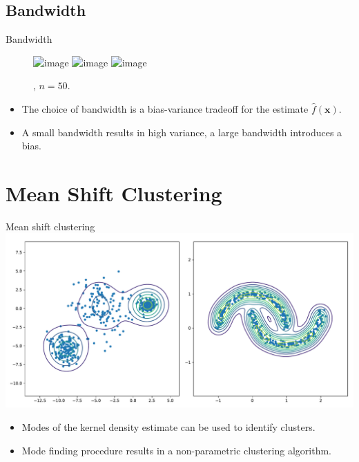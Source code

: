 \documentclass[18pt]{beamer}
\begin{document}
\subsection{Bandwidth}

\begin{frame}{Bandwidth}
	\begin{figure}
		\includegraphics<1>[width=\textwidth]{figures/kernel-density-estimation-gaussian-50}
		\includegraphics<2>[width=\textwidth]{figures/kernel-density-estimation-uniform-50}
		\includegraphics<3>[width=\textwidth]{figures/kernel-density-estimation-epanechnikov-50}
		\vspace*{-6mm}
		\caption{, $n = 50$.}
	\end{figure}
	\begin{itemize}
		\item The choice of bandwidth is a bias-variance tradeoff for the estimate $\hat{f}(\bm{x})$.
		\item A small bandwidth results in high variance, a large bandwidth introduces a bias.
	\end{itemize}
\end{frame}



\section{Mean Shift Clustering}


\begin{frame}{Mean shift clustering}
	\centering
	\includegraphics[height=0.5\textheight]{figures/mean-shift-introduction}
	\begin{itemize}
		\item Modes of the kernel density estimate can be used to identify clusters.
		\item Mode finding procedure results in a non-parametric clustering algorithm.
	\end{itemize}
\end{frame}
\end{document}

